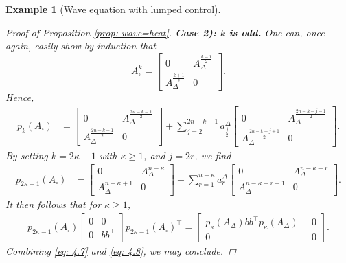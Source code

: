 \documentclass[11pt, a4paper, reqno]{amsart}
\theoremstyle{plain}
\numberwithin{equation}{section}
\newtheorem{example}{Example}[section]
\begin{document}
\begin{example}[Wave equation with lumped control]
\begin{proof}[Proof of Proposition \ref{prop: wave=heat}]
	\smallskip
	
	\noindent
	\textbf{Case 2): $k$ is odd.} One can, once again, easily show by induction that
	\begin{equation*}
	A_\square^k = \begin{bmatrix} 0 & A_\Delta^{\frac{k-1}{2}} \\
	A_\Delta^{\frac{k+1}{2}} & 0 \end{bmatrix}.
	\end{equation*}
	Hence, 
	\begin{align*}
	p_k(A_\square) &= \begin{bmatrix} 0 & A_\Delta^{\frac{2n-k-1}{2}} \\
	A_\Delta^{\frac{2n-k+1}{2}} & 0 \end{bmatrix}+ \sum_{j=2}^{2n-k-1} a_{\frac{j}{2}}^\Delta \begin{bmatrix} 0 & A_\Delta^{\frac{2n-k-j-1}{2}} \\
	A_\Delta^{\frac{2n-k-j+1}{2}} & 0 \end{bmatrix}.
	\end{align*}
	By setting $k=2\kappa-1$ with $\kappa\geqslant1$, and $j=2r$, we find 
	\begin{align*}
	p_{2\kappa-1}(A_\square) &=  \begin{bmatrix} 0 & A_\Delta^{n-\kappa} \\
	A_\Delta^{n-\kappa+1} & 0 \end{bmatrix} + \sum_{r=1}^{n-\kappa} a_r^\Delta \begin{bmatrix} 0 & A_\Delta^{n-\kappa-r} \\
	A_\Delta^{n-\kappa+r+1} & 0 \end{bmatrix}.
	\end{align*}
	It then follows that for $\kappa\geqslant1$, 
	\begin{align} \label{eq: 4.8}
	p_{2\kappa-1}(A_\square)\begin{bmatrix} 0 & 0\\
	0 & bb^\top\end{bmatrix} p_{2\kappa-1}(A_{\square})^\top =  \begin{bmatrix}p_{\kappa}(A_\Delta) bb^\top p_{\kappa}(A_\Delta)^\top & 0 \\ 0 & 0\end{bmatrix}.
	\end{align}
	Combining \eqref{eq: 4.7} and \eqref{eq: 4.8}, we may conclude.
	\end{proof}


\end{example}
\end{document}
